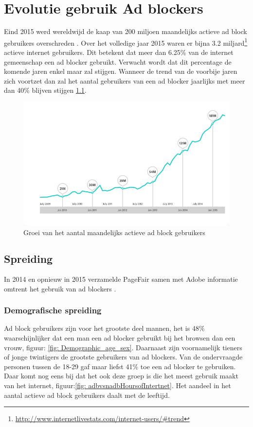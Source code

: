 \documentclass[pdftex,a4paper,12pt,twoside]{report}
\begin{document}
\chapter{Evolutie gebruik Ad blockers}
\label{ch:Evolutie gebruik Ad blockers}
Eind 2015 werd wereldwijd de kaap van 200 miljoen maandelijks actieve ad block gebruikers overschreden \citep{PageFair2015}. Over het volledige jaar 2015 waren er bijna 3.2 miljard\footnote{\url{ http://www.internetlivestats.com/internet-users/\#trend}} actieve internet gebruikers. Dit betekent dat meer dan 6.25\% van de internet gemeenschap een ad blocker gebruikt. Verwacht wordt dat dit percentage de komende jaren enkel maar zal stijgen. Wanneer de trend van de voorbije jaren zich voortzet dan zal het aantal gebruikers van een ad blocker jaarlijks met meer dan 40\% blijven stijgen \ref{fig: adblock-growth}.
\begin{figure}[h!]
\centering
\includegraphics[width=12cm]{img/adblock-growth}
\caption{Groei van het aantal maandelijks actieve ad block gebruikers}
\label{fig: adblock-growth}
\end{figure}
\section{Spreiding}
\label{sec:Spreiding}
In 2014 en opnieuw in 2015 verzamelde PageFair samen met Adobe informatie omtrent het gebruik van ad blockers \citep{PageFair2015,PageFair2014}.

\subsection{Demografische spreiding}
\label{sec Demografische spreiding}
Ad block gebruikers zijn voor het grootste deel mannen, het is 48\% waarschijnlijker dat een man een ad blocker gebruikt bij het browsen dan een vrouw, figuur: \ref{fig: Demographic_age_sex}. Daarnaast zijn voornamelijk tieners of jonge twintigers de grootste gebruikers van ad blockers. Van de ondervraagde personen tussen de 18-29 gaf maar liefst 41\% toe een ad blocker te gebruiken. Daar komt nog eens bij dat het ook deze groep is die het meest gebruik maakt van het internet, figuur:\ref{fig: adbvsnadbHoursofIntertnet}. Het aandeel in het aantal actieve ad block gebruikers daalt met de leeftijd.
\end{document}
